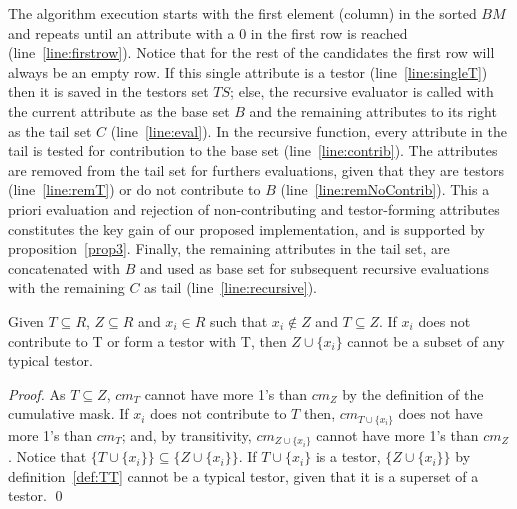 \documentclass[citeauthoryear]{llncs}
\begin{document}
	The algorithm execution starts with the first element (column) in the sorted $BM$ and repeats until an 
	attribute with a 0 in the first row is reached (line~\ref{line:firstrow}). Notice that for the rest of the
	candidates the first row will always be an empty row. If this single attribute is a testor (line~\ref{line:singleT})
	then it is saved in the testors set $TS$; else, the recursive evaluator is called with the current attribute
	as the base set $B$ and the remaining attributes to its right as the tail set $C$ (line~\ref{line:eval}).
	In the recursive function, every attribute in the tail is tested for contribution to the base set 
	(line~\ref{line:contrib}). The attributes are removed from the tail set for furthers evaluations, given
	that they are testors (line~\ref{line:remT}) or do not contribute to $B$ (line~\ref{line:remNoContrib}).
	This a priori evaluation and rejection of non-contributing and testor-forming attributes constitutes the key
	gain of our proposed implementation, and is supported by proposition~\ref{prop3}.
	Finally, the remaining attributes in the tail set, are concatenated with $B$ and used as base set for
	subsequent recursive evaluations with the remaining $C$ as tail (line~\ref{line:recursive}).

	\begin{proposition}\label{prop3} 
		Given $T \subseteq R$, $Z \subseteq R$ and  $x_i \in R$ such that $x_i \notin Z$ and $T \subseteq Z$. If 
		$x_i$ does not contribute to T or form a testor with T, then 	$Z\cup\{x_i\}$ cannot be a subset of any 
		typical testor.
	\end{proposition}	
	
	\begin{proof}
		As $T \subseteq Z$, $cm_T$ cannot have more 1's than $cm_Z$ by the definition of the cumulative mask.
		If $x_i$ does not contribute to $T$ then, $cm_{T \cup \lbrace x_i \rbrace}$ does not have more 1's than
		$cm_T$; and, by transitivity, $cm_{Z \cup \lbrace x_i \rbrace}$ cannot have more 1's than $cm_Z$. 
		Notice that  $\lbrace T \cup \lbrace x_i \rbrace\rbrace \subseteq \lbrace Z \cup \lbrace x_i \rbrace\rbrace$.
		If $T \cup \lbrace x_i \rbrace$ is a testor, $\lbrace Z \cup \lbrace x_i \rbrace\rbrace$ by 
		definition~\ref{def:TT} 	cannot be a typical testor, given that it is a superset of a testor.
	\qed
	\end{proof}
	
\end{document}
